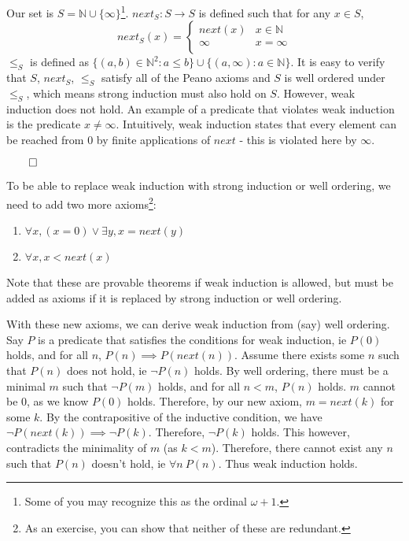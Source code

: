 \documentclass[12pt]{report}
\begin{document}
Our set is $S = \mathbb{N} \cup \{\infty\}$\footnote{Some of you may recognize this as the ordinal $\omega + 1$.}. $next_{S} : S \rightarrow S$ is defined such that for any $x \in S$,
\begin{equation*}
  next_{S}(x) = \begin{cases}
    next(x) & x \in \mathbb{N}\\
    \infty & x = \infty\\
  \end{cases}
\end{equation*}
$\leq_{S}$ is defined as $\{(a, b) \in \mathbb{N}^2 : a \leq b\} \cup \{(a, \infty) : a \in \mathbb{N}\}$. It is easy to verify that $S$, $next_{S}$, $\leq_{S}$ satisfy all of the Peano axioms and $S$ is well ordered under $\leq_{S}$, which means strong induction must also hold on $S$. However, weak induction does not hold. An example of a predicate that violates weak induction is the predicate $x \neq \infty$. Intuitively, weak induction states that every element can be reached from $0$ by finite applications of $next$ - this is violated here by $\infty$.

$\qed$

To be able to replace weak induction with strong induction or well ordering, we need to add two more axioms\footnote{As an exercise, you can show that neither of these are redundant.}:
\begin{enumerate}
  \item $\forall x, (x = 0) \lor \exists y, x = next(y)$
  \item $\forall x, x < next(x)$
\end{enumerate}
Note that these are provable theorems if weak induction is allowed, but must be added as axioms if it is replaced by strong induction or well ordering. 

With these new axioms, we can derive weak induction from (say) well ordering. Say $P$ is a predicate that satisfies the conditions for weak induction, ie $P(0)$ holds, and for all $n$, $P(n) \implies P(next(n))$. Assume there exists some $n$ such that $P(n)$ does not hold, ie $\neg P(n)$ holds. By well ordering, there must be a minimal $m$ such that $\neg P(m)$ holds, and for all $n < m$, $P(n)$ holds. $m$ cannot be $0$, as we know $P(0)$ holds. Therefore, by our new axiom, $m = next(k)$ for some $k$. By the contrapositive of the inductive condition, we have $\neg P(next(k)) \implies \neg P(k)$. Therefore, $\neg P(k)$ holds. This however, contradicts the minimality of $m$ (as $k < m$). Therefore, there cannot exist any $n$ such that $P(n)$ doesn't hold, ie $\forall n\ P(n)$. Thus weak induction holds.
\end{document}
